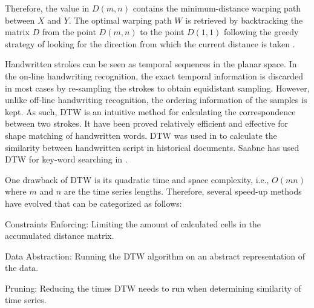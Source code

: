 Therefore, the value in $D(m,n)$ contains the minimum-distance warping path between $X$ and $Y$.
The optimal warping path $W$ is retrieved by backtracking the matrix $D$ from the point $D(m,n)$ to the point $D(1,1)$ following the greedy strategy of looking for the direction from which the current distance is taken \cite{senin2008dynamic}.

\iftoggle{edit-mode}{\hspace{0pt}\marginpar{stroke trajectories similarity measure using DTW}}{}
Handwritten strokes can be seen as temporal sequences in the planar space. 
In the on-line handwriting recognition, the exact temporal information is discarded in most cases by re-sampling the strokes to obtain equidistant sampling. 
However, unlike off-line handwriting recognition, the ordering information of the samples is kept. 
As such, DTW is an intuitive method for calculating the correspondence between two strokes. 
It have been proved relatively efficient and effective for shape matching of handwritten words. 
DTW was used in \cite{rath2003word, rath2003indexing, moghaddam2009application} to calculate the similarity between handwritten script in historical documents. 
Saabne has used DTW for key-word searching in \cite{saabni2011fast, saabni2008keyword}.


\iftoggle{edit-mode}{\hspace{0pt}\marginpar{DTW Speedup}}{}
One drawback of DTW is its quadratic time and space complexity, i.e., $O(mn)$ where $m$ and $n$ are the time series lengths. 
Therefore, several speed-up methods have evolved that can be categorized as follows:

\begin{compactitem}
\item Constraints Enforcing: Limiting the amount of calculated cells in the accumulated distance matrix.
\item Data Abstraction: Running the DTW algorithm on an abstract representation of the data.
\item Pruning: Reducing the times DTW needs to run when determining similarity of time series.
\end{compactitem}

